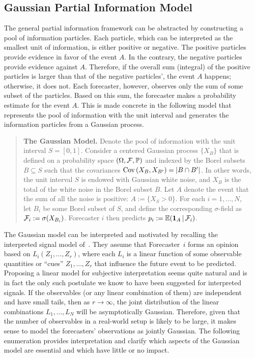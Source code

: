 \documentclass[11pt]{article}
\renewcommand{\P}{\mathbb{P}}
\newcommand{\E}{\mathbb{E}}
\theoremstyle{definition}
\theoremstyle{definition}
\def\one{{\bf 1}}
\def\F{{\cal F}}
\def\P{{\mathbb P}}
\def\E{{\mathbb E}}
\def\Cov{{\rm Cov}\,}
\def\|{\, | \,}
\begin{document}
\subsection{Gaussian Partial Information Model}
\label{ss:Gaussian}
The general partial information framework can be abstracted by constructing a pool of information particles. Each particle, which can be interpreted as the smallest unit of information, is either positive or negative. The positive particles provide evidence in favor of the event $A$. 
In the contrary, the negative particles provide evidence against $A$. Therefore, if the overall sum (integral) of the positive particles is larger than that of the negative particles', the event $A$ happens; otherwise, it does not. Each forecaster, however, observes only the sum of some subset of the particles. Based on this sum, the forecaster makes a probability estimate for the event $A$. This is made concrete in the following model that  represents the pool of information with the unit interval and generates the information particles from a Gaussian process. 

\begin{quote}
{\bf The Gaussian Model.} Denote the pool of information with the unit interval $S = [0,1]$. Consider a centered Gaussian process $\{X_B\}$ that is defined on a probability space $(\Omega
, \F , \P)$ and indexed by the Borel subsets $B \subseteq S$ such that the
covariances $\Cov (X_B , X_{B'}) = |B \cap B'|$.  In other words, the
unit interval $S$ is endowed with Gaussian white noise, and $X_B$ is the
total of the white noise in the Borel subset $B$.  Let $A$ denote the
event that the sum of all the noise is positive: $A := \{ X_S > 0 \}$.
For each $i = 1, \dots, N$, let $B_i$ be some Borel subset of $S$, and
define the corresponding $\sigma$-field as $\F_i := \sigma (X_{B_i})$. Forecaster $i$ then predicts $p_i :=
\E (\one_A \| \F_i)$.
\end{quote}

The Gaussian model can be interpreted and motivated by recalling the interpreted signal
model of~\citet{broomell2009experts}. They assume that
Forecaster~$i$ forms an opinion based on $L_i (Z_1 , \ldots , Z_r)$,
where each $L_i$ is a linear function of some observable quantities or ``cues''
$Z_1 , \ldots , Z_r$ that influence the future event to be predicted.  Proposing a linear model for subjective
interpretation seems quite natural and is in fact the only such
postulate we know to have been suggested for interpreted signals.  If
the observables (or any linear combination of them) are independent
and have small tails, then as $r \to \infty$, the joint distribution
of the linear combinations $L_1 , \ldots , L_N$ will be asymptotically
Gaussian.  Therefore, given that the number of observables in a real-world setup is likely to be large, it makes sense
to model the forecasters' observations as jointly Gaussian.  The
following enumeration provides interpretation and clarify which
aspects of the Gaussian model are essential and which have little or
no impact.
\end{document}
